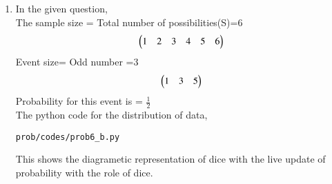\renewcommand{\theequation}{\theenumi}
\begin{enumerate}[label=\arabic*.,ref=\thesubsubsection.\theenumi]
\item In the given question,
\\
The sample size = Total number of possibilities(S)=6
\begin{align}
\begin{pmatrix}1&2&3&4&5&6\end{pmatrix}
\end{align}
Event size= Odd number =3
\begin{align}
\begin{pmatrix}1&3&5\end{pmatrix}
\end{align}
Probability for this event is = $\frac{1}{2}$
\\
The python code for the distribution of data,
\begin{lstlisting}
prob/codes/prob6_b.py
\end{lstlisting}
This shows the diagrametic representation of dice with the live update of probability with the role of dice.
\end{enumerate}

